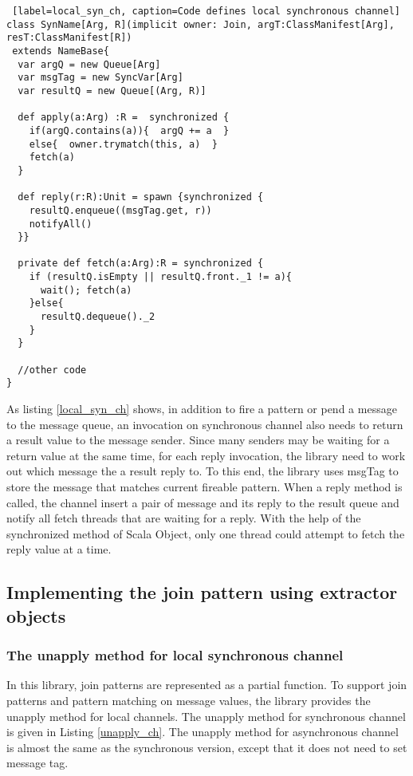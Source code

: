 \begin{lstlisting} [label=local_syn_ch, caption=Code defines local synchronous channel]
class SynName[Arg, R](implicit owner: Join, argT:ClassManifest[Arg], resT:ClassManifest[R])
 extends NameBase{
  var argQ = new Queue[Arg]
  var msgTag = new SyncVar[Arg]
  var resultQ = new Queue[(Arg, R)]

  def apply(a:Arg) :R =  synchronized {
    if(argQ.contains(a)){  argQ += a  }
    else{  owner.trymatch(this, a)  }
    fetch(a)
  }
  
  def reply(r:R):Unit = spawn {synchronized {
    resultQ.enqueue((msgTag.get, r))
    notifyAll()
  }}

  private def fetch(a:Arg):R = synchronized {
    if (resultQ.isEmpty || resultQ.front._1 != a){
      wait(); fetch(a)
    }else{
      resultQ.dequeue()._2
    }
  }

  //other code
}
\end{lstlisting}

As listing \ref{local_syn_ch} shows, in addition to fire a pattern or pend a message to the message queue, an invocation on synchronous channel also needs to return a result value to the message sender.  Since many senders may be waiting for a return value at the same time, for each reply invocation, the library need to work out which message the a result reply to.  To this end, the library uses msgTag to store the message that matches current fireable pattern.  When a reply method is called, the channel insert a pair of message and its reply to the result queue and notify all fetch threads that are waiting for a reply.  With the help of the synchronized method of Scala Object, only one thread could attempt to fetch the reply value at a time.


\subsection{Implementing the join pattern using extractor objects}

\subsubsection{The unapply method for local synchronous channel}

In this library, join patterns are represented as a partial function.  To support join patterns and pattern matching on message values, the library provides the unapply method for local channels.  The unapply method for synchronous channel is given in Listing \ref{unapply_ch}.    The unapply method for asynchronous channel is almost the same as the synchronous version, except that it does not need to set message tag. 

